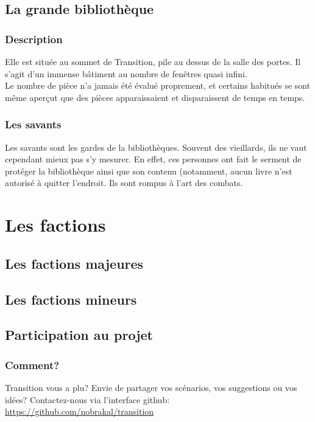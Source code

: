 \documentclass{book}
\begin{document}
\section{La grande bibliothèque}
\subsection{Description}
Elle est située au sommet de Transition, pile au dessus de la salle des portes. Il s'agit d'un immense bâtiment au nombre de fenêtres quasi infini.\\
Le nombre de pièce n'a jamais été évalué proprement, et certains habitués se sont même aperçut que des pièces apparaissaient et disparaissent de temps en temps.
\subsection{Les savants}
Les savants sont les gardes de la bibliothèques. Souvent des vieillards, ils ne vaut cependant mieux pas s'y mesurer. En effet, ces personnes ont fait le serment de protéger la bibliothèque ainsi que son contenu (notamment, aucun livre n'est autorisé à quitter l'endroit. Ils sont rompus à l'art des combats.

\chapter{Les factions}
\section{Les factions majeures}
\section{Les factions mineurs}


\newpage
\section{Participation au projet}
\subsection{Comment?}
\hypertarget{participation}{}
Transition vous a plu? 
Envie de partager vos scénarios, vos suggestions ou vos idées?
\newline
Contactez-nous via l'interface github: \href {https://github.com/nobrakal/transition} {https://github.com/nobrakal/transition}
\end{document}
